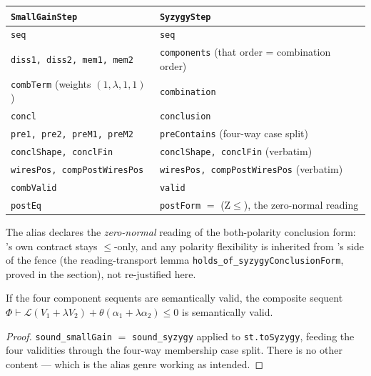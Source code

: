 \begin{brecipe}
\label{rec:sg-transport}
\begin{center}\small
\begin{tabular}{@{}ll@{}}
\textbf{\texttt{SmallGainStep}} & \textbf{\texttt{SyzygyStep}}\\
\midrule
\texttt{seq} & \texttt{seq}\\
\texttt{diss1, diss2, mem1, mem2} & \texttt{components} (that order = combination order)\\
\texttt{combTerm} \textnormal{(weights $(1,\lambda,1,1)$)} & \texttt{combination}\\
\texttt{concl} & \texttt{conclusion}\\
\texttt{pre1, pre2, preM1, preM2} & \texttt{preContains} (four-way case split)\\
\texttt{conclShape, conclFin} & \texttt{conclShape, conclFin} (verbatim)\\
\texttt{wiresPos, compPostWiresPos} & \texttt{wiresPos, compPostWiresPos} (verbatim)\\
\texttt{combValid} & \texttt{valid}\\
\texttt{postEq} & \texttt{postForm} $=$ \textnormal{(Z$\leq$), the zero-normal reading}\\
\end{tabular}
\end{center}
The alias declares the \emph{zero-normal} reading of the both-polarity
conclusion form: 's own contract stays
$\leq$-only, and any polarity flexibility is inherited from
's side of the fence (the reading-transport lemma
\texttt{holds\_of\_syzygyConclusionForm}, proved in the 
section), not re-justified here.
\end{brecipe}

\begin{bprop}\label{prop:sg-sound}
If the four component sequents are semantically valid, the composite
sequent
$\Phi \vdash \mathcal{L}(V_1 + \lambda V_2) + \theta(\alpha_1 +
\lambda\alpha_2) \leq 0$ is semantically valid.
\end{bprop}
\begin{proof}
\texttt{sound\_smallGain} $=$ \texttt{sound\_syzygy} applied to
\texttt{st.toSyzygy}, feeding the four validities through the four-way
membership case split. There is no other content --- which is the alias
genre working as intended.
\end{proof}


